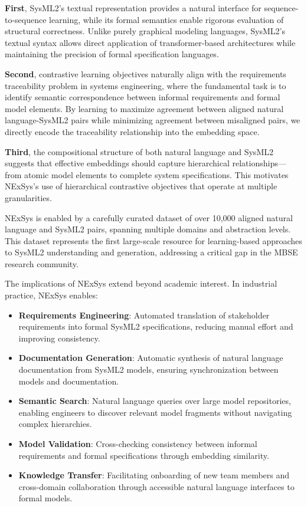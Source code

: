 \documentclass{article}
\begin{document}
\textbf{First}, SysML2's textual representation provides a natural interface for sequence-to-sequence learning, while its formal semantics enable rigorous evaluation of structural correctness. Unlike purely graphical modeling languages, SysML2's textual syntax allows direct application of transformer-based architectures while maintaining the precision of formal specification languages.

\textbf{Second}, contrastive learning objectives naturally align with the requirements traceability problem in systems engineering, where the fundamental task is to identify semantic correspondence between informal requirements and formal model elements. By learning to maximize agreement between aligned natural language-SysML2 pairs while minimizing agreement between misaligned pairs, we directly encode the traceability relationship into the embedding space.

\textbf{Third}, the compositional structure of both natural language and SysML2 suggests that effective embeddings should capture hierarchical relationships—from atomic model elements to complete system specifications. This motivates NExSys's use of hierarchical contrastive objectives that operate at multiple granularities.

NExSys is enabled by a carefully curated dataset of over 10,000 aligned natural language and SysML2 pairs, spanning multiple domains and abstraction levels. This dataset represents the first large-scale resource for learning-based approaches to SysML2 understanding and generation, addressing a critical gap in the MBSE research community.

The implications of NExSys extend beyond academic interest. In industrial practice, NExSys enables:
\begin{itemize}
\item \textbf{Requirements Engineering}: Automated translation of stakeholder requirements into formal SysML2 specifications, reducing manual effort and improving consistency.
\item \textbf{Documentation Generation}: Automatic synthesis of natural language documentation from SysML2 models, ensuring synchronization between models and documentation.
\item \textbf{Semantic Search}: Natural language queries over large model repositories, enabling engineers to discover relevant model fragments without navigating complex hierarchies.
\item \textbf{Model Validation}: Cross-checking consistency between informal requirements and formal specifications through embedding similarity.
\item \textbf{Knowledge Transfer}: Facilitating onboarding of new team members and cross-domain collaboration through accessible natural language interfaces to formal models.
\end{itemize}
\end{document}
